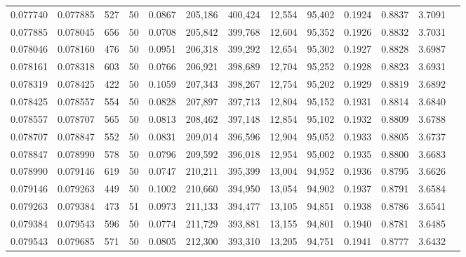 \begin{tabular}{rrrrrrrrrrrrr}
0.077740 & 0.077885 &   527 &  50 &                                     0.0867 & 205,186 & 400,424 &  12,554 &  95,402 & 0.1924 & 0.8837 & 3.7091 \\
0.077885 & 0.078045 &   656 &  50 &                                     0.0708 & 205,842 & 399,768 &  12,604 &  95,352 & 0.1926 & 0.8832 & 3.7031 \\
0.078046 & 0.078160 &   476 &  50 &                                     0.0951 & 206,318 & 399,292 &  12,654 &  95,302 & 0.1927 & 0.8828 & 3.6987 \\
0.078161 & 0.078318 &   603 &  50 &                                     0.0766 & 206,921 & 398,689 &  12,704 &  95,252 & 0.1928 & 0.8823 & 3.6931 \\
0.078319 & 0.078425 &   422 &  50 &                                     0.1059 & 207,343 & 398,267 &  12,754 &  95,202 & 0.1929 & 0.8819 & 3.6892 \\
0.078425 & 0.078557 &   554 &  50 &                                     0.0828 & 207,897 & 397,713 &  12,804 &  95,152 & 0.1931 & 0.8814 & 3.6840 \\
0.078557 & 0.078707 &   565 &  50 &                                     0.0813 & 208,462 & 397,148 &  12,854 &  95,102 & 0.1932 & 0.8809 & 3.6788 \\
0.078707 & 0.078847 &   552 &  50 &                                     0.0831 & 209,014 & 396,596 &  12,904 &  95,052 & 0.1933 & 0.8805 & 3.6737 \\
0.078847 & 0.078990 &   578 &  50 &                                     0.0796 & 209,592 & 396,018 &  12,954 &  95,002 & 0.1935 & 0.8800 & 3.6683 \\
0.078990 & 0.079146 &   619 &  50 &                                     0.0747 & 210,211 & 395,399 &  13,004 &  94,952 & 0.1936 & 0.8795 & 3.6626 \\
0.079146 & 0.079263 &   449 &  50 &                                     0.1002 & 210,660 & 394,950 &  13,054 &  94,902 & 0.1937 & 0.8791 & 3.6584 \\
0.079263 & 0.079384 &   473 &  51 &                                     0.0973 & 211,133 & 394,477 &  13,105 &  94,851 & 0.1938 & 0.8786 & 3.6541 \\
0.079384 & 0.079543 &   596 &  50 &                                     0.0774 & 211,729 & 393,881 &  13,155 &  94,801 & 0.1940 & 0.8781 & 3.6485 \\
0.079543 & 0.079685 &   571 &  50 &                                     0.0805 & 212,300 & 393,310 &  13,205 &  94,751 & 0.1941 & 0.8777 & 3.6432 \\

\end{tabular}
